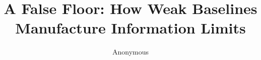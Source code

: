 \documentclass{article}
\title{A False Floor: How Weak Baselines Manufacture Information Limits}
\author{Anonymous}
\begin{document}
\maketitle

\begin{abstract}

\end{abstract}





\end{document}
